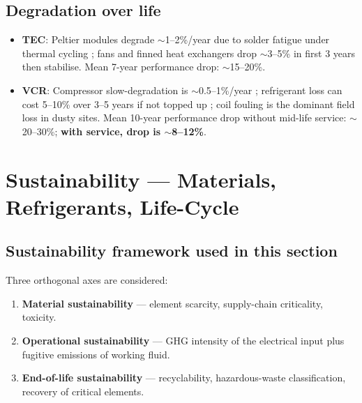 \documentclass[11pt,a4paper]{article}
\begin{document}
\subsection{Degradation over life}
\begin{itemize}[leftmargin=*]
  \item \textbf{TEC}: Peltier modules degrade $\sim$1--2\%/year due to solder fatigue under thermal cycling \citep{tec_reliability_wereszczak_2012,peltier_handbook_2018}; fans and finned heat exchangers drop $\sim$3--5\% in first 3 years then stabilise. Mean 7-year performance drop: $\sim$15--20\%.
  \item \textbf{VCR}: Compressor slow-degradation is $\sim$0.5--1\%/year \citep{ashrae_hvac_maintenance_2021}; refrigerant loss can cost 5--10\% over 3--5 years if not topped up \citep{fgas_leakage_eu_assessment_2022}; coil fouling is the dominant field loss in dusty sites. Mean 10-year performance drop without mid-life service: $\sim$20--30\%; \textbf{with service, drop is $\sim$8--12\%}.
\end{itemize}

\section{Sustainability --- Materials, Refrigerants, Life-Cycle}
\label{sec:sustainability}

\subsection{Sustainability framework used in this section}
Three orthogonal axes are considered:
\begin{enumerate}[leftmargin=*]
  \item \textbf{Material sustainability} --- element scarcity, supply-chain criticality, toxicity.
  \item \textbf{Operational sustainability} --- GHG intensity of the electrical input plus fugitive emissions of working fluid.
  \item \textbf{End-of-life sustainability} --- recyclability, hazardous-waste classification, recovery of critical elements.
\end{enumerate}
\end{document}
